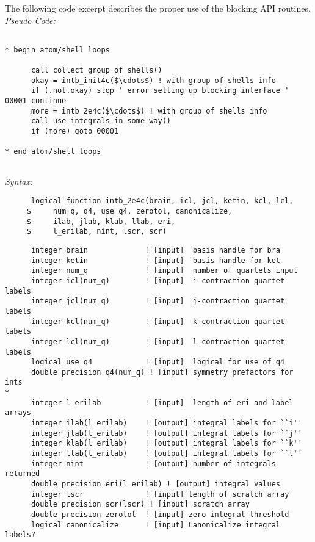 The following code excerpt describes the proper use of the blocking 
API routines.\\ 
{\it Pseudo Code:} 
\begin{verbatim} 
 
* begin atom/shell loops 
 
      call collect_group_of_shells() 
      okay = intb_init4c($\cdots$) ! with group of shells info      
      if (.not.okay) stop ' error setting up blocking interface ' 
00001 continue 
      more = intb_2e4c($\cdots$) ! with group of shells info 
      call use_integrals_in_some_way() 
      if (more) goto 00001 
 
* end atom/shell loops 
 
\end{verbatim} 
 
{\it Syntax:} 
\begin{verbatim} 
      logical function intb_2e4c(brain, icl, jcl, ketin, kcl, lcl, 
     $     num_q, q4, use_q4, zerotol, canonicalize, 
     $     ilab, jlab, klab, llab, eri, 
     $     l_erilab, nint, lscr, scr) 
\end{verbatim} 
\begin{verbatim} 
      integer brain             ! [input]  basis handle for bra  
      integer ketin             ! [input]  basis handle for ket  
      integer num_q             ! [input]  number of quartets input 
      integer icl(num_q)        ! [input]  i-contraction quartet labels 
      integer jcl(num_q)        ! [input]  j-contraction quartet labels 
      integer kcl(num_q)        ! [input]  k-contraction quartet labels 
      integer lcl(num_q)        ! [input]  l-contraction quartet labels 
      logical use_q4            ! [input]  logical for use of q4 
      double precision q4(num_q) ! [input] symmetry prefactors for ints 
*      
      integer l_erilab          ! [input]  length of eri and label arrays 
      integer ilab(l_erilab)    ! [output] integral labels for ``i''  
      integer jlab(l_erilab)    ! [output] integral labels for ``j''  
      integer klab(l_erilab)    ! [output] integral labels for ``k''  
      integer llab(l_erilab)    ! [output] integral labels for ``l''  
      integer nint              ! [output] number of integrals returned 
      double precision eri(l_erilab) ! [output] integral values 
      integer lscr              ! [input] length of scratch array 
      double precision scr(lscr) ! [input] scratch array 
      double precision zerotol  ! [input] zero integral threshold 
      logical canonicalize      ! [input] Canonicalize integral labels? 
\end{verbatim} 
 
